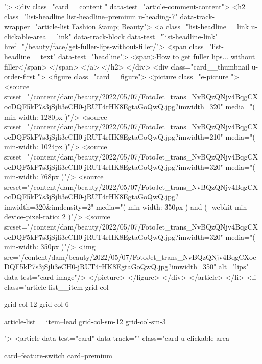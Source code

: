 {{{			 ">
<div class="card__content " data-test="article-comment-content">
<h2 class="list-headline list-headline--premium u-heading-7" data-track-wrapper="article-list Fashion &amp; Beauty">
<a class="list-headline__link u-clickable-area__link" data-track-block data-test="list-headline-link" href="/beauty/face/get-fuller-lips-without-filler/">
<span class="list-headline__text" data-test="headline">
<span>How to get fuller lips... without filler</span>
</span>
</a>
</h2>
</div>
<div class="card__thumbnail u-order-first ">
<figure class="card__figure">
<picture class="e-picture   ">
<source srcset="/content/dam/beauty/2022/05/07/FotoJet_trans_NvBQzQNjv4BqgCXocDQF5kP7s3jSjli3eCH0-jRUT4rHK8EgtaGoQwQ.jpg?imwidth=320" media="( min-width: 1280px )"/>
<source srcset="/content/dam/beauty/2022/05/07/FotoJet_trans_NvBQzQNjv4BqgCXocDQF5kP7s3jSjli3eCH0-jRUT4rHK8EgtaGoQwQ.jpg?imwidth=210" media="( min-width: 1024px )"/>
<source srcset="/content/dam/beauty/2022/05/07/FotoJet_trans_NvBQzQNjv4BqgCXocDQF5kP7s3jSjli3eCH0-jRUT4rHK8EgtaGoQwQ.jpg?imwidth=320" media="( min-width: 768px )"/>
<source srcset="/content/dam/beauty/2022/05/07/FotoJet_trans_NvBQzQNjv4BqgCXocDQF5kP7s3jSjli3eCH0-jRUT4rHK8EgtaGoQwQ.jpg?imwidth=320&imdensity=2" media="( min-width: 350px ) and ( -webkit-min-device-pixel-ratio: 2 )"/>
<source srcset="/content/dam/beauty/2022/05/07/FotoJet_trans_NvBQzQNjv4BqgCXocDQF5kP7s3jSjli3eCH0-jRUT4rHK8EgtaGoQwQ.jpg?imwidth=320" media="( min-width: 350px )"/>
<img src="/content/dam/beauty/2022/05/07/FotoJet_trans_NvBQzQNjv4BqgCXocDQF5kP7s3jSjli3eCH0-jRUT4rHK8EgtaGoQwQ.jpg?imwidth=350" alt="lips" data-test="card-image"/>
</picture>
</figure>
</div>
</article>
</li>
<li class="article-list__item
				grid-col
				
				
				
				grid-col-12
				grid-col-6
				
				
				
				
				article-list__item--lead grid-col-sm-12
				grid-col-sm-3
				
				
				">
<article data-test="card" data-track="" class="card
			u-clickable-area
			
			card--feature-switch
			card--premium
			
			
			
			
			
}}}
